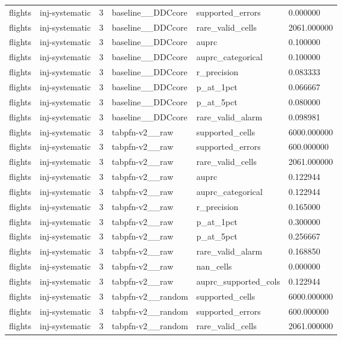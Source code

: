 \begin{tabular}{llllll}
flights & inj-systematic & 3 & baseline\_\_DDCcore & supported\_errors & 0.000000 \\
flights & inj-systematic & 3 & baseline\_\_DDCcore & rare\_valid\_cells & 2061.000000 \\
flights & inj-systematic & 3 & baseline\_\_DDCcore & auprc & 0.100000 \\
flights & inj-systematic & 3 & baseline\_\_DDCcore & auprc\_categorical & 0.100000 \\
flights & inj-systematic & 3 & baseline\_\_DDCcore & r\_precision & 0.083333 \\
flights & inj-systematic & 3 & baseline\_\_DDCcore & p\_at\_1pct & 0.066667 \\
flights & inj-systematic & 3 & baseline\_\_DDCcore & p\_at\_5pct & 0.080000 \\
flights & inj-systematic & 3 & baseline\_\_DDCcore & rare\_valid\_alarm & 0.098981 \\
flights & inj-systematic & 3 & tabpfn-v2\_\_raw & supported\_cells & 6000.000000 \\
flights & inj-systematic & 3 & tabpfn-v2\_\_raw & supported\_errors & 600.000000 \\
flights & inj-systematic & 3 & tabpfn-v2\_\_raw & rare\_valid\_cells & 2061.000000 \\
flights & inj-systematic & 3 & tabpfn-v2\_\_raw & auprc & 0.122944 \\
flights & inj-systematic & 3 & tabpfn-v2\_\_raw & auprc\_categorical & 0.122944 \\
flights & inj-systematic & 3 & tabpfn-v2\_\_raw & r\_precision & 0.165000 \\
flights & inj-systematic & 3 & tabpfn-v2\_\_raw & p\_at\_1pct & 0.300000 \\
flights & inj-systematic & 3 & tabpfn-v2\_\_raw & p\_at\_5pct & 0.256667 \\
flights & inj-systematic & 3 & tabpfn-v2\_\_raw & rare\_valid\_alarm & 0.168850 \\
flights & inj-systematic & 3 & tabpfn-v2\_\_raw & nan\_cells & 0.000000 \\
flights & inj-systematic & 3 & tabpfn-v2\_\_raw & auprc\_supported\_cols & 0.122944 \\
flights & inj-systematic & 3 & tabpfn-v2\_\_random & supported\_cells & 6000.000000 \\
flights & inj-systematic & 3 & tabpfn-v2\_\_random & supported\_errors & 600.000000 \\
flights & inj-systematic & 3 & tabpfn-v2\_\_random & rare\_valid\_cells & 2061.000000 \\

\end{tabular}

